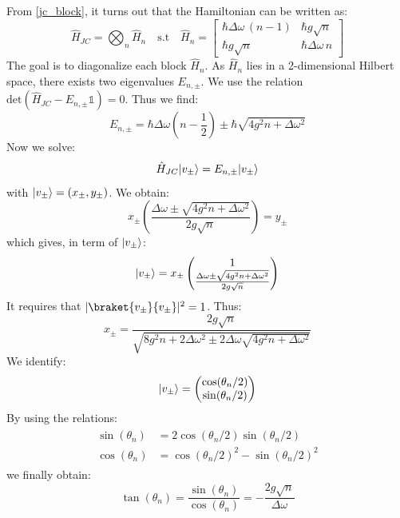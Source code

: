 \documentclass[11pt]{report}
\DeclarePairedDelimiter\ket{\lvert}{\rangle}
\begin{document}
From \ref{jc_block}, it turns out that the Hamiltonian can be written as:
\begin{equation}
\hat{H}_{JC} = \bigotimes_n \hat{H}_n \quad \textrm{s.t} \quad \hat{H}_n = \begin{bmatrix}
\hbar \Delta\omega \, (n-1) & \hbar g \sqrt{n}\\
\hbar g \sqrt{n} & \hbar \Delta\omega \, n
\end{bmatrix}
\end{equation}
The goal is to diagonalize each block $\hat{H}_n$. As $\hat{H}_n$ lies in a 2-dimensional Hilbert space, there exists two eigenvalues $E_{n,\pm}$. We use the relation $\textrm{det}(\hat{H}_{JC} - E_{n,\pm}\mathbb{1}) = 0$. Thus we find:
\begin{equation}
E_{n,\pm} = \hbar\Delta\omega(n-\frac{1}{2}) \pm \hbar\sqrt{4g^2 n + \Delta\omega^2}
\end{equation}
Now we solve:
\begin{equation}
\hat{H}_{JC} \ket{v_\pm} = E_{n,\pm}\ket{v_\pm}
\end{equation}
with $\ket{v_\pm}=(x_\pm,y_\pm)$. We obtain:
\begin{equation}
x_\pm \left( \frac{\Delta\omega \pm \sqrt{4g^2n + \Delta\omega^2}}{2g\sqrt{n}} \right) = y_\pm
\end{equation}
which gives, in term of $\ket{v_\pm}$:
\begin{equation}
\ket{v_\pm} = x_\pm \begin{pmatrix}
1\\
\frac{\Delta\omega \pm \sqrt{4g^2n + \Delta\omega^2}}{2g\sqrt{n}}
\end{pmatrix}
\end{equation}
It requires that $\vert\braket{v_\pm}{v_\pm}\vert^2 = 1$. Thus:
\begin{equation}
x_\pm = \frac{2g\sqrt{n}}{\sqrt{8g^2n + 2\Delta\omega^2 \pm 2\Delta\omega \sqrt{4g^2n + \Delta\omega^2}}}
\end{equation}
We identify:
\begin{equation}
\ket{v_\pm} = \begin{pmatrix}
\cos(\theta_n/2)\\
\sin(\theta_n/2)
\end{pmatrix}
\end{equation}
By using the relations:
\begin{align}
\begin{split}
\sin(\theta_n) &= 2\cos(\theta_n/2)\sin(\theta_n/2)\\
\cos(\theta_n) &= \cos(\theta_n/2)^2 - \sin(\theta_n/2)^2
\end{split}
\end{align}
we finally obtain:
\begin{equation}
\tan(\theta_n) = \frac{\sin(\theta_n)}{\cos(\theta_n)} = -\frac{2g\sqrt{n}}{\Delta\omega}
\end{equation}
\end{document}
